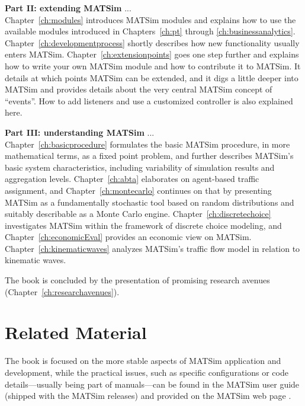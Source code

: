\textbf{Part II: extending MATSim} ... \\
Chapter~\ref{ch:modules} introduces MATSim modules and explains how to use the available modules introduced in Chapters~\ref{ch:pt} through \ref{ch:businessanalytics}. Chapter~\ref{ch:developmentprocess} shortly describes how new functionality usually enters MATSim. Chapter~\ref{ch:extensionpoints} goes one step further and explains how to write your own MATSim module and how to contribute it to MATSim. It details at which points MATSim can be extended, and it digs a little deeper into MATSim and provides details about the very central MATSim concept of ``events''. How to add listeners and use a customized controller is also explained here.

\textbf{Part III: understanding MATSim} ... \\
Chapter~\ref{ch:basicprocedure} formulates the basic MATSim procedure, in more mathematical terms, as a fixed point problem, and further describes MATSim's basic system characteristics, including variability of simulation results and aggregation levels. Chapter~\ref{ch:abta} elaborates on agent-based traffic assignment, and Chapter~\ref{ch:montecarlo} continues on that by presenting MATSim as a fundamentally stochastic tool based on random distributions and suitably describable as a Monte Carlo engine. Chapter~\ref{ch:discretechoice} investigates MATSim within the framework of discrete choice modeling, and Chapter~\ref{ch:economicEval} provides an economic view on MATSim. Chapter~\ref{ch:kinematicwaves} analyzes MATSim's traffic flow model in relation to kinematic waves.

The book is concluded by the presentation of promising research avenues (Chapter~\ref{ch:researchavenues}).

\section*{Related Material}
The book is focused on the more stable aspects of MATSim application and development, while the practical issues, such as specific configurations or code details---usually being part of manuals---can be found in the MATSim user guide (shipped with the MATSim releases) and provided on the MATSim web page \citep[][]{MATSim_Userguide_2014}.

